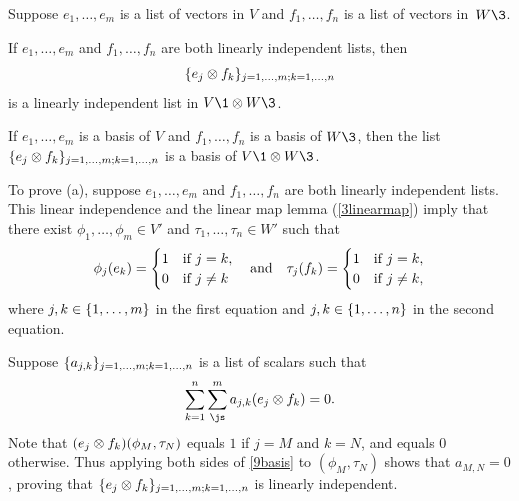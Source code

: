 {Suppose $e_1, \ldots, e_m$ is a list of vectors in $V$ and $f_1, \ldots, f_n$ is a list of vectors in~$W\3$.
\begin{subtheorem}
\item
If $e_1, \ldots, e_m$ and $f_1, \ldots, f_n$ are both linearly independent lists, then
\[
\{e_j \otimes f_k\}_{j = 1, \ldots, m; k = 1, \ldots, n}
\]
is a linearly independent list in $V\1 \tensor W\3$.
\item
If $e_1, \ldots, e_m$ is a basis of $V$ and $f_1, \ldots, f_n$ is a basis of $W\3$, then the list
$
\{e_j \otimes f_k\}_{j = 1, \ldots, m; k = 1, \ldots, n}$
is a basis of $V\1 \tensor W\3$.
\end{subtheorem}}

\proof
To prove (a), suppose $e_1, \ldots, e_m$ and $f_1, \ldots, f_n$ are both linearly independent lists. This linear independence and the linear map lemma (\ref{3linearmap}) imply that there exist $\phi_1, \ldots, \phi_m \in V'$ and $\tau_1, \ldots, \tau_n \in W'$ such that
\vspace{-.02in} %
\[
\phi_j(e_k) = \begin{cases}
1 & \text{if } j = k,\\
0 & \text{if } j \ne k
\end{cases}
\andd
\tau_j(f_k) = \begin{cases}
1 & \text{if } j = k,\\
0 & \text{if } j \ne k,
\end{cases}
\vspace{-.02in} %
\]
where $j, k \in \{1, \ldots, m\}$ in the first equation and $j, k \in \{1, \ldots, n\}$ in the second equation.

Suppose $\{a_{j,k}\}_{j = 1, \ldots, m; k = 1, \ldots, n}$ is a list of scalars such that
\vspace{-.04in} %
\begin{equation} \label{9basis}
\sum_{k=1}^n \sum_{\js}^m a_{j,k} (e_j \tensor f_k) = 0.
\vspace{-.04in} %
\end{equation}%
Note that $(e_j \otimes f_k)(\phi_M, \tau_N)$ equals $1$ if $j=M$ and $k = N$, and equals $0$ otherwise. Thus applying both sides of \ref{9basis} to $(\phi_M, \tau_N)$ shows that $a_{M,N} = 0$, proving that
$\{e_j \otimes f_k\}_{j = 1, \ldots, m; k = 1, \ldots, n}$ is linearly independent.

